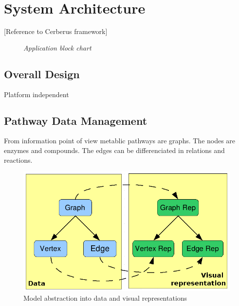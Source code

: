 \chapter{System Architecture}

[Reference to Cerberus framework]

\begin{figure}[ht]
\centering
{} 
\caption[Application block chart]{\textit{Application block chart}} 
\label{gfx:application_block_chart}
\end{figure}

\section{Overall Design}

Platform independent

\section{Pathway Data Management}

From information point of view metablic pathways are graphs. The nodes are enzymes and compounds. The edges can be differenciated in relations and reactions.

\begin{figure}[ht]
  \centering
    \includegraphics[width=0.5\linewidth]{gfx/model_view_data_diagram}
  \caption{Model abstraction into data and visual representations}
  \label{fig:model_view_data_diagram}
\end{figure}

